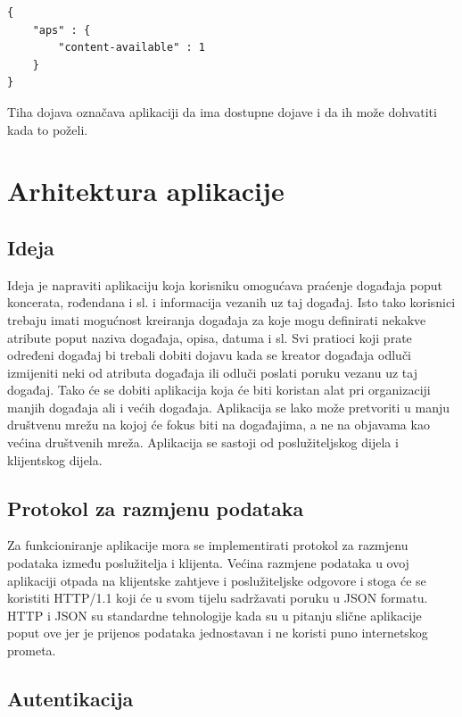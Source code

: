 \documentclass[times, utf8, zavrsni]{fer}
\begin{document}
\begin{lstlisting}[caption=JSON objekt za \glqq tihu\grqq\  dojavu, label=lst:tiha-dojava, float]
{
    "aps" : {
        "content-available" : 1
    }
}
\end{lstlisting}

Tiha dojava označava aplikaciji da ima dostupne dojave i da ih može dohvatiti kada to poželi.

\chapter{Arhitektura aplikacije}

\section{Ideja}
Ideja je napraviti aplikaciju koja korisniku omogućava praćenje događaja poput koncerata, rođendana i sl. i informacija vezanih uz taj događaj. Isto tako korisnici trebaju imati mogućnost kreiranja događaja za koje mogu definirati nekakve atribute poput naziva događaja, opisa, datuma i sl. Svi pratioci koji prate određeni događaj bi trebali dobiti dojavu kada se kreator događaja odluči izmijeniti neki od atributa događaja ili odluči poslati poruku vezanu uz taj događaj. Tako će se dobiti aplikacija koja će biti koristan alat pri organizaciji manjih događaja ali i većih događaja. Aplikacija se lako može pretvoriti u manju društvenu mrežu na kojoj će fokus biti na događajima, a ne na objavama kao većina društvenih mreža. Aplikacija se sastoji od poslužiteljskog dijela i klijentskog dijela.

\section{Protokol za razmjenu podataka}

Za funkcioniranje aplikacije mora se implementirati protokol za razmjenu podataka između poslužitelja i klijenta. Većina razmjene podataka u ovoj aplikaciji otpada na klijentske zahtjeve i poslužiteljske odgovore i stoga će se koristiti HTTP/1.1 koji će u svom tijelu sadržavati poruku u JSON formatu. HTTP i JSON su standardne tehnologije kada su u pitanju slične aplikacije poput ove jer je prijenos podataka jednostavan i ne koristi puno internetskog prometa.

\section{Autentikacija}
\end{document}
